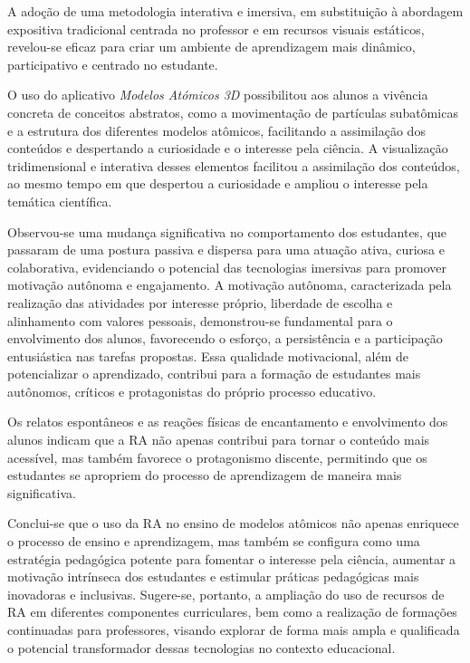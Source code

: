 \documentclass[portuguese]{textolivre}
\begin{document}
A adoção de uma metodologia interativa e imersiva, em substituição à abordagem expositiva tradicional centrada no professor e em recursos visuais estáticos, revelou-se eficaz para criar um ambiente de aprendizagem mais dinâmico, participativo e centrado no estudante.

O uso do aplicativo \emph{Modelos Atómicos 3D} possibilitou aos alunos a vivência concreta de conceitos abstratos, como a movimentação de partículas subatômicas e a estrutura dos diferentes modelos atômicos, facilitando a assimilação dos conteúdos e despertando a curiosidade e o interesse pela ciência. A visualização tridimensional e interativa desses elementos facilitou a assimilação dos conteúdos, ao mesmo tempo em que despertou a curiosidade e ampliou o interesse pela temática científica.

Observou-se uma mudança significativa no comportamento dos estudantes, que passaram de uma postura passiva e dispersa para uma atuação ativa, curiosa e colaborativa, evidenciando o potencial das tecnologias imersivas para promover motivação autônoma e engajamento. A motivação autônoma, caracterizada pela realização das atividades por interesse próprio, liberdade de escolha e alinhamento com valores pessoais, demonstrou-se fundamental para o envolvimento dos alunos, favorecendo o esforço, a persistência e a participação entusiástica nas tarefas propostas. Essa qualidade motivacional, além de potencializar o aprendizado, contribui para a formação de estudantes mais autônomos, críticos e protagonistas do próprio processo educativo.

Os relatos espontâneos e as reações físicas de encantamento e envolvimento dos alunos indicam que a RA não apenas contribui para tornar o conteúdo mais acessível, mas também favorece o protagonismo discente, permitindo que os estudantes se apropriem do processo de aprendizagem de maneira mais significativa.

Conclui-se que o uso da RA no ensino de modelos atômicos não apenas enriquece o processo de ensino e aprendizagem, mas também se configura como uma estratégia pedagógica potente para fomentar o interesse pela ciência, aumentar a motivação intrínseca dos estudantes e estimular práticas pedagógicas mais inovadoras e inclusivas. Sugere-se, portanto, a ampliação do uso de recursos de RA em diferentes componentes curriculares, bem como a realização de formações continuadas para professores, visando explorar de forma mais ampla e qualificada o potencial transformador dessas tecnologias no contexto educacional.
\end{document}
